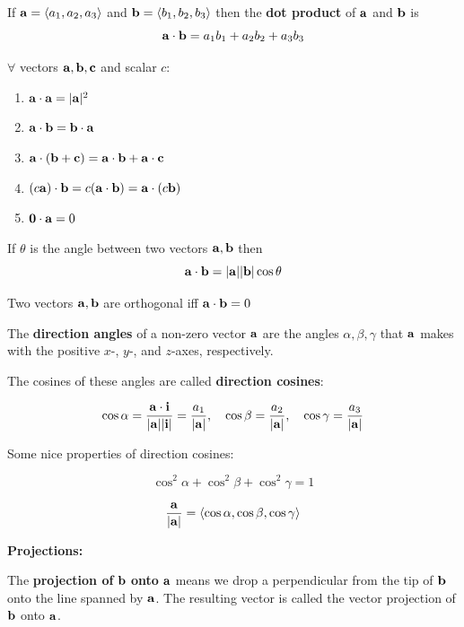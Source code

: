 \documentclass{report}
\begin{document}
\begin{definition}
If $\mathbf{a} = \langle a_1, a_2, a_3 \rangle$ and $\mathbf{b} = \langle b_1, b_2, b_3\rangle$ then the \textbf{dot product}
of $\mathbf{a} $ and $\mathbf{b}$ is 
\[
\mathbf{a} \cdot \mathbf{b} = a_1 b_1 + a_2 b_2 + a_3 b_3
\]
\end{definition}

\begin{tcolorbox}[colback=red!5!white, colframe=red!75!black, title=Properties of the Dot Product]
$\forall$ vectors $\mathbf{a}, \mathbf{b}, \mathbf{c}$ and scalar $c$:
\begin{enumerate}
    \item $\mathbf{a} \cdot \mathbf{a} = |\mathbf{a}|^2$
    \item $\mathbf{a} \cdot \mathbf{b} = \mathbf{b} \cdot \mathbf{a}$
    \item $\mathbf{a} \cdot (\mathbf{b} + \mathbf{c}) = \mathbf{a} \cdot \mathbf{b} + \mathbf{a} \cdot \mathbf{c}$
    \item $(c \mathbf{a}) \cdot \mathbf{b} = c (\mathbf{a} \cdot \mathbf{b}) = \mathbf{a} \cdot (c \mathbf{b})$
    \item $\mathbf{0} \cdot \mathbf{a} = 0$
\end{enumerate}
\end{tcolorbox}

\begin{theorem}
    If $\theta$ is the angle between two vectors $\mathbf{a}, \mathbf{b}$ then 
    \[\mathbf{a} \cdot \mathbf{b} = |\mathbf{a}| |\mathbf{b}| \cos \theta\]
\end{theorem}

\begin{corollary}
    Two vectors $\mathbf{a}, \mathbf{b}$ are orthogonal iff $\mathbf{a} \cdot \mathbf{b} = 0$
\end{corollary}

The \textbf{direction angles} of a non-zero vector $\mathbf{a}$ are the angles 
$\alpha, \beta, \gamma$ that $\mathbf{a}$ makes with the positive $x$-, $y$-, and $z$-axes, respectively.

The cosines of these angles are called \textbf{direction cosines}:

\[\cos \alpha = \frac{\mathbf{a} \cdot \mathbf{i}}{|\mathbf{a}||\mathbf{i}|} = \frac{a_1}{|\mathbf{a}|},
\quad \cos \beta = \frac{a_2}{|\mathbf{a}|},
\quad \cos \gamma = \frac{a_3}{|\mathbf{a}|}\]

Some nice properties of direction cosines:

\[\cos^2 \alpha + \cos^2 \beta + \cos^2 \gamma = 1\]

\[\frac{\mathbf{a}}{|\mathbf{a}|} = \langle \cos \alpha, \cos \beta, \cos \gamma \rangle\]

\textbf{Projections:}

The \textbf{projection of} $\mathbf{b}$ \textbf{onto} $\mathbf{a}$ means we drop a perpendicular 
from the tip of $\mathbf{b}$ onto the line spanned by $\mathbf{a}$. The resulting vector is called 
the vector projection of $\mathbf{b}$ onto $\mathbf{a}$.
\end{document}
